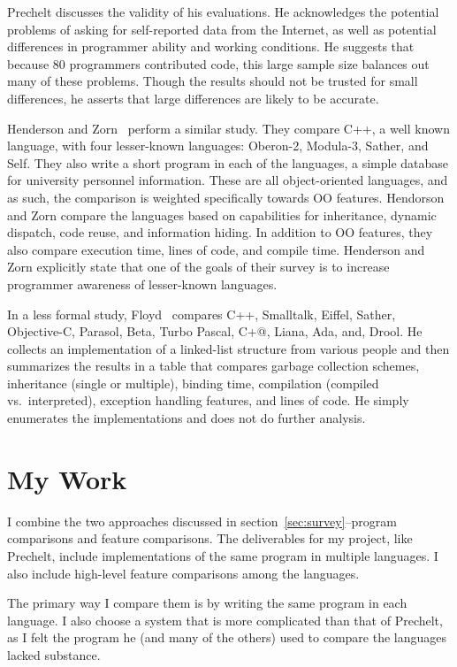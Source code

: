\documentclass{article}
\begin{document}
Prechelt discusses the validity of his evaluations.  He acknowledges the
potential problems of asking for self-reported data from the Internet, as well
as potential differences in programmer ability and working conditions.  He
suggests that because 80 programmers contributed code, this large sample size
balances out many of these problems.  Though the results should not be trusted
for small differences, he asserts that large differences are likely to be
accurate.

Henderson and Zorn~\cite{Henderson4OOLangComp} perform a similar study.  They
compare C++, a well known language, with four lesser-known languages: Oberon-2,
Modula-3, Sather, and Self.  They also write a short program in each of the
languages, a simple database for university personnel information.  These are
all object-oriented languages, and as such, the comparison is weighted
specifically towards OO features.  Hendorson and Zorn compare the languages
based on capabilities for inheritance, dynamic dispatch, code reuse, and
information hiding.  In addition to OO features, they also compare execution
time, lines of code, and compile time.  Henderson and Zorn explicitly state
that one of the goals of their survey is to increase programmer awareness of
lesser-known languages.

In a less formal study, Floyd~\cite{DDJFloydeCompOOLangs} compares C++,
Smalltalk, Eiffel, Sather, Objective-C, Parasol, Beta, Turbo Pascal, C+@,
Liana, Ada, and, Drool.  He collects an implementation of a linked-list
structure from various people and then summarizes the results in a table that
compares garbage collection schemes, inheritance (single or multiple), binding
time, compilation (compiled vs.~interpreted), exception handling features, and
lines of code.  He simply enumerates the implementations and does not do
further analysis.

\section{My Work}

I combine the two approaches discussed in section~\ref{sec:survey}--program
comparisons and feature comparisons.  The deliverables for my project, like
Prechelt, include implementations of the same program in multiple languages. I
also include high-level feature comparisons among the languages.

The primary way I compare them is by writing the same program in each
language.  I also choose a system that is more complicated than that of Prechelt,
as I felt the program he (and many of the others) used to compare the languages
lacked substance.
\end{document}
